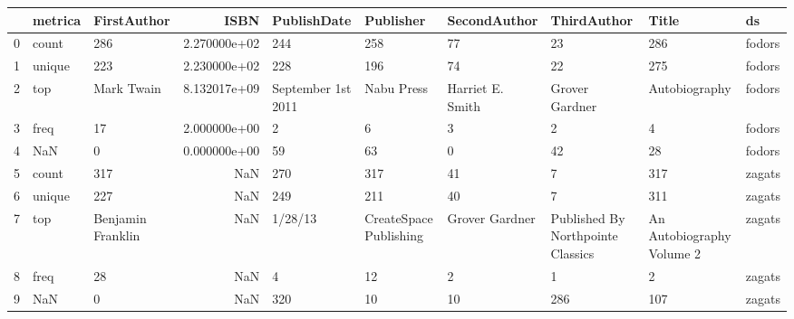 \begin{tabular}{lllrllllll}
\toprule
{} & metrica &        FirstAuthor &          ISBN &         PublishDate &               Publisher &      SecondAuthor &                        ThirdAuthor &                      Title &      ds \\
\midrule
0 &   count &                286 &  2.270000e+02 &                 244 &                     258 &                77 &                                 23 &                        286 &  fodors \\
1 &  unique &                223 &  2.230000e+02 &                 228 &                     196 &                74 &                                 22 &                        275 &  fodors \\
2 &     top &         Mark Twain &  8.132017e+09 &  September 1st 2011 &              Nabu Press &  Harriet E. Smith &                     Grover Gardner &              Autobiography &  fodors \\
3 &    freq &                 17 &  2.000000e+00 &                   2 &                       6 &                 3 &                                  2 &                          4 &  fodors \\
4 &     NaN &                  0 &  0.000000e+00 &                  59 &                      63 &                 0 &                                 42 &                         28 &  fodors \\
5 &   count &                317 &           NaN &                 270 &                     317 &                41 &                                  7 &                        317 &  zagats \\
6 &  unique &                227 &           NaN &                 249 &                     211 &                40 &                                  7 &                        311 &  zagats \\
7 &     top &  Benjamin Franklin &           NaN &             1/28/13 &  CreateSpace Publishing &    Grover Gardner &  Published By Northpointe Classics &  An Autobiography Volume 2 &  zagats \\
8 &    freq &                 28 &           NaN &                   4 &                      12 &                 2 &                                  1 &                          2 &  zagats \\
9 &     NaN &                  0 &           NaN &                 320 &                      10 &                10 &                                286 &                        107 &  zagats \\
\bottomrule
\end{tabular}

